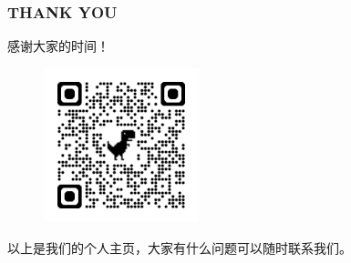 \documentclass{beamer}
\begin{document}
\begin{frame}
    \frametitle{THANK YOU}

    \begin{block}{}
        \begin{center}
            \Huge{感谢大家的时间！}
        \end{center}
    \end{block}
    \begin{figure}[h]
        \centering
        \includegraphics[width=0.4\textwidth]{figure/qrcode_www.yuque.com.png}
        \label{fig:home_page}
    \end{figure}
    \small{以上是我们的个人主页，大家有什么问题可以随时联系我们。}
\end{frame}
\end{document}
